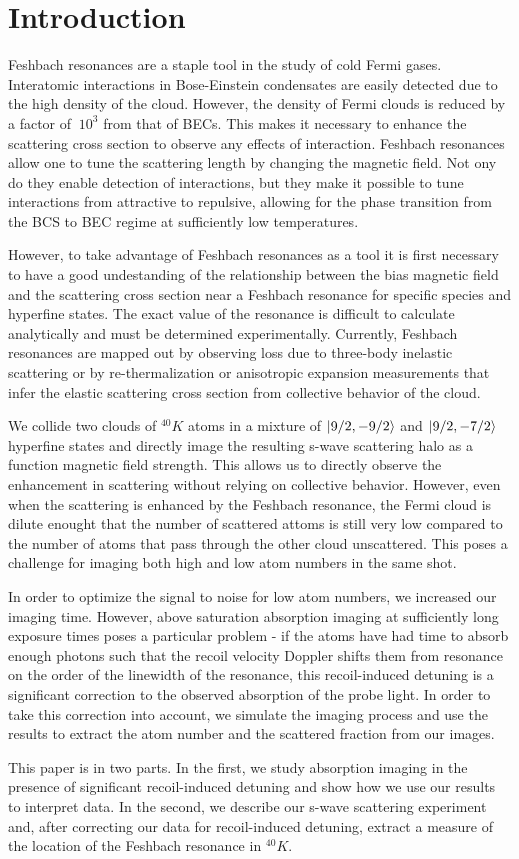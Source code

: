 \documentclass[12pt]{iopart}
\begin{document}
\section{Introduction}
Feshbach resonances are a staple tool in the study of cold Fermi gases. Interatomic interactions in Bose-Einstein condensates are easily detected due to the high density of the cloud. However, the density of Fermi clouds is reduced by a factor of $~10^3$ from that of BECs. This makes it necessary to enhance the scattering cross section to observe any effects of interaction. Feshbach resonances allow one to tune the scattering length by changing the magnetic field. Not ony do they enable detection of interactions, but they make it possible to tune interactions from attractive to repulsive, allowing for the phase transition from the BCS to BEC regime at sufficiently low temperatures. 
\par However, to take advantage of Feshbach resonances as a tool it  is first necessary to have a good undestanding of the relationship between the bias magnetic field and the scattering cross section near a Feshbach resonance for specific species and hyperfine states.  The exact value of the resonance is difficult to calculate analytically and must be determined experimentally. Currently, Feshbach resonances are mapped out by observing loss due to three-body inelastic scattering or by re-thermalization or anisotropic expansion measurements that infer the elastic scattering cross section from collective behavior of the cloud. 
\par We collide two clouds of $^{40}K$ atoms in a mixture of $\mathinner{|{9/2,-9/2}\rangle}$ and $\mathinner{|{9/2,-7/2}\rangle}$ hyperfine states and directly image the resulting s-wave scattering halo as a function magnetic field strength. This allows us to directly observe the enhancement in scattering without relying on collective behavior. However, even when the scattering is enhanced by the Feshbach resonance, the Fermi cloud is dilute enought that the number of scattered attoms is still very low compared to the number of atoms that pass through the other cloud unscattered. This poses a challenge for imaging both high and low atom numbers in the same shot.
\par In order to optimize the signal to noise for low atom numbers, we increased our imaging time.  However, above saturation absorption imaging at sufficiently long exposure times poses a particular problem - if the atoms have had time to absorb enough photons such that the recoil velocity Doppler shifts them from resonance on the order of the linewidth of the resonance, this recoil-induced detuning is a significant correction to the observed absorption of the probe light. In order to take this correction into account, we simulate the imaging process and use the results to extract the atom number and the scattered fraction from our images.
\par This paper is in two parts. In the first, we study absorption imaging in the presence of significant recoil-induced detuning and show how we use our results to interpret data. In the second, we describe our s-wave scattering experiment and, after correcting our data for recoil-induced detuning, extract a measure of the location of the Feshbach resonance in $^{40}K$. 
\end{document}
